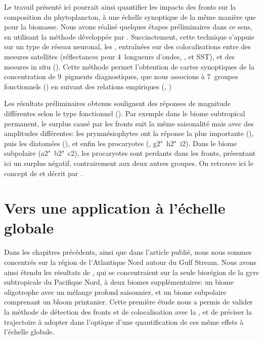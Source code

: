 Le travail présenté ici pourrait ainsi quantifier les impacts des fronts sur la composition du phytoplancton, à une échelle synoptique de la même manière que pour la biomasse.
Nous avons réalisé quelques étapes préliminaires dans ce sens, en utilisant la méthode développée par \textcite{elhourany_2019,elhourany_2019a}.
Succinctement, cette technique s'appuie sur un type de réseau neuronal, les , entraînées sur des colocalisations entre des mesures satellites (réflectances pour 4~longueurs d'ondes, , et SST), et des mesures in situ ().
Cette méthode permet l'obtention de cartes synoptiques de la concentration de 9~pigments diagnostiques, que nous associons à 7~groupes fonctionnels () en suivant des relations empiriques (, \cite{vidussi_2001,uitz_2006,brewin_2010,hirata_2011})

Les résultats préliminaires obtenus soulignent des réponses de magnitude différentes selon le type fonctionnel (). Par exemple dans le biome subtropical permanent, le surplus causé par les fronts suit la même saisonalité mais avec des amplitudes différentes: les prymnésiophytes ont la réponse la plus importante (), puis les diatomées (), et enfin les procaryotes (,  g2"~h2"~i2).
Dans le biome subpolaire (a2"~b2"~c2), les procaryotes sont perdants dans les fronts, présentant ici un surplus négatif, contrairement aux deux autres groupes.
On retrouve ici le concept de  et  décrit par \textcite{mangolte_2022}.

\begin{figure}
  \centering
  \label{fig:ts-pft}
\end{figure}

\section{Vers une application à l'échelle globale}
\label{sec:appl-globale}

Dans les chapitres précédents, ainsi que dans l'article publié, nous nous sommes concentrés sur la région de l'Atlantique Nord autour du Gulf Stream.
Nous avons ainsi étendu les résultats de \textcite{liu_2016}, qui se concentraient sur la seule biorégion de la gyre subtropicale du Pacifique Nord, à deux biomes supplémentaires: un biome oligotrophe avec un mélange profond saisonnier, et un biome subpolaire comprenant un bloom printanier.
Cette première étude nous a permis de valider la méthode de détection des fronts et de colocalisation avec la , et de préciser la trajectoire à adopter dans l'optique d'une quantification de ces même effets à l'échelle globale.

